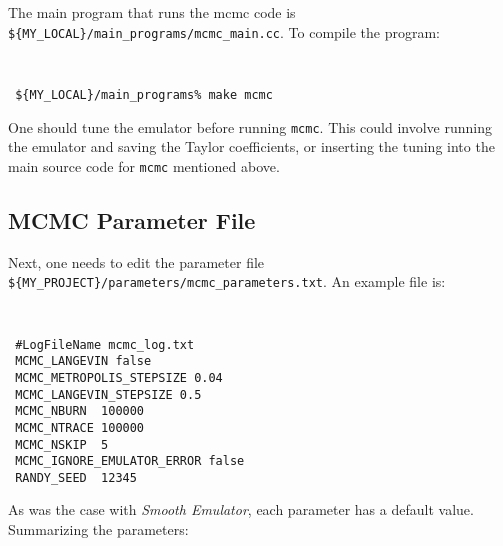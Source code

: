 \documentclass[UserManual.tex]{subfiles}
\begin{document}
The main program that runs the mcmc code is {\tt\$\{MY\_LOCAL\}/main\_programs/mcmc\_main.cc}. To compile the program:
{\tt
\begin{verbatim}
 ${MY_LOCAL}/main_programs% make mcmc
\end{verbatim}}

One should tune the emulator before running {\tt mcmc}. This could involve running the emulator and saving the Taylor coefficients, or inserting the tuning into the main source code for {\tt mcmc} mentioned above.

\subsection{MCMC Parameter File}

Next, one needs to edit the parameter file {\tt\$\{MY\_PROJECT\}/parameters/mcmc\_parameters.txt}. An example file is:
{\tt
\begin{verbatim}
 #LogFileName mcmc_log.txt
 MCMC_LANGEVIN false
 MCMC_METROPOLIS_STEPSIZE 0.04
 MCMC_LANGEVIN_STEPSIZE 0.5
 MCMC_NBURN  100000
 MCMC_NTRACE 100000
 MCMC_NSKIP  5
 MCMC_IGNORE_EMULATOR_ERROR false
 RANDY_SEED  12345
\end{verbatim}}
As was the case with {\it Smooth Emulator}, each parameter has a default value. Summarizing the parameters:
\end{document}
